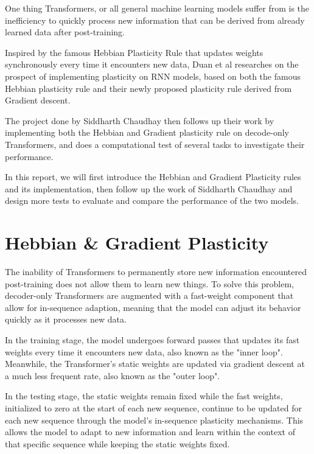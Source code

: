 \documentclass{article}
\begin{document}
One thing Transformers, or all general machine learning models suffer from is the inefficiency to quickly process new information that can be derived from already learned data after post-training.

Inspired by the famous Hebbian Plasticity Rule that updates weights synchronously every time it encounters new data, Duan et al researches on the prospect of implementing plasticity on RNN models, based on both the famous Hebbian plasticity rule and their newly proposed plasticity rule derived from Gradient descent. \cite{duan2023hebbiangradientbasedplasticityenables}

The project done by Siddharth Chaudhay then follows up their work by implementing both the Hebbian and Gradient plasticity rule on decode-only Transformers, and does a computational test of several tasks to investigate their performance.\cite{chaudhary2025enablingrobustincontextmemory}

In this report, we will first introduce the Hebbian and Gradient Plasticity rules and its implementation, then follow up the work of Siddharth Chaudhay and design more tests to evaluate and compare the performance of the two models.

\section{Hebbian \& Gradient Plasticity}

The inability of Transformers to permanently store new information encountered post-training does not allow them to learn new things. To solve this problem, decoder-only Transformers are augmented with a fast-weight component that allow for in-sequence adaption, meaning that the model can adjust its behavior quickly as it processes new data. \vspace{3pt}

In the training stage, the model undergoes forward passes that updates its fast weights every time it encounters new data, also known as the "inner loop". Meanwhile, the Transformer's static weights are updated via gradient descent at a much less frequent rate, also known as the "outer loop". \vspace{3pt}

\noindent
In the testing stage, the static weights remain fixed while the fast weights, initialized to zero at the start of each new sequence, continue to be updated for each new sequence through the model's in-sequence plasticity mechanisms. This allows the model to adapt to new information and learn  within the context of that specific sequence while keeping the static weights fixed. \vspace{3pt}
\end{document}
